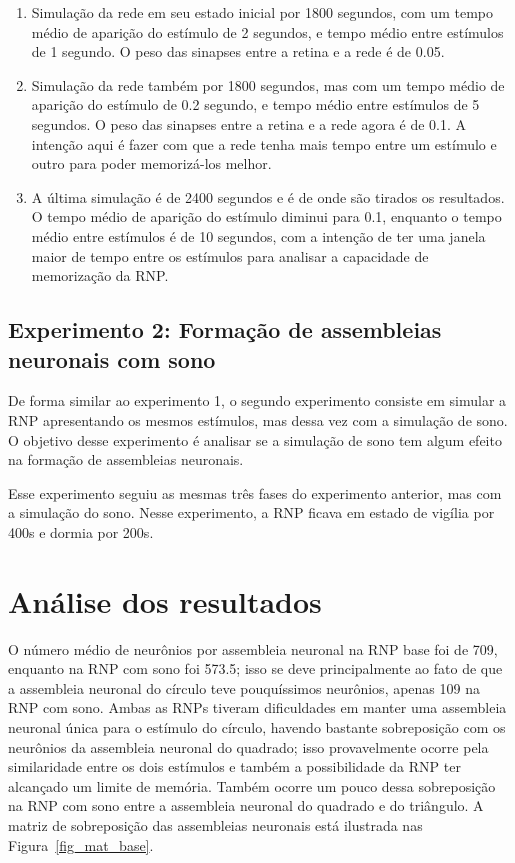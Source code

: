 \begin{enumerate}
  \item Simulação da rede em seu estado inicial por 1800 segundos, com um tempo médio de aparição do estímulo de 2 segundos, e
  tempo médio entre estímulos de 1 segundo. O peso das sinapses entre a retina e a rede é de 0.05.
  \item Simulação da rede também por 1800 segundos, mas com um tempo médio de aparição do estímulo de 0.2 segundo, e
  tempo médio entre estímulos de 5 segundos. O peso das sinapses entre a retina e a rede agora é de 0.1. A intenção aqui é
  fazer com que a rede tenha mais tempo entre um estímulo e outro para poder memorizá-los melhor.
  \item A última simulação é de 2400 segundos e é de onde são tirados os resultados. O tempo médio de aparição do estímulo diminui
  para 0.1, enquanto o tempo médio entre estímulos é de 10 segundos, com a intenção de ter uma janela maior de tempo entre os
  estímulos para analisar a capacidade de memorização da RNP.
\end{enumerate}


\subsection{Experimento 2: Formação de assembleias neuronais com sono}

De forma similar ao experimento 1, o segundo experimento consiste em simular a RNP apresentando os mesmos estímulos, mas dessa vez
com a simulação de sono. O objetivo desse experimento é analisar se a simulação de sono tem algum efeito na formação de
assembleias neuronais.

Esse experimento seguiu as mesmas três fases do experimento anterior, mas com a simulação do sono. Nesse experimento, a RNP ficava
em estado de vigília por 400s e dormia por 200s.


\section{Análise dos resultados}

O número médio de neurônios por assembleia neuronal na RNP base foi de 709, enquanto na RNP com sono foi 573.5; isso se deve
principalmente ao fato de que a assembleia neuronal do círculo teve pouquíssimos neurônios, apenas 109 na RNP com sono. Ambas as
RNPs tiveram dificuldades em manter uma assembleia neuronal única para o estímulo do círculo, havendo bastante sobreposição com os
neurônios da assembleia neuronal do quadrado; isso provavelmente ocorre pela similaridade entre os dois estímulos e também a
possibilidade da RNP ter alcançado um limite de memória. Também ocorre um pouco dessa sobreposição na RNP com sono entre a
assembleia neuronal do quadrado e do triângulo. A matriz de sobreposição das assembleias neuronais está ilustrada nas
Figura~\ref{fig_mat_base}.

